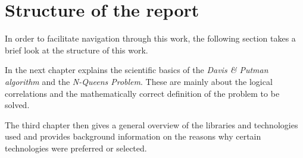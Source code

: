 \section{Structure of the report}
\label{sec:introStructure}
In order to facilitate navigation through this work, the following section takes a brief look at the structure of this work.

In the next chapter explains the scientific basics of the \textit{Davis \& Putman algorithm} and the \textit{N-Queens Problem}. These are mainly about the logical correlations and the mathematically correct definition of the problem to be solved.

The third chapter then gives a general overview of the libraries and technologies used and provides background information on the reasons why certain technologies were preferred or selected.

